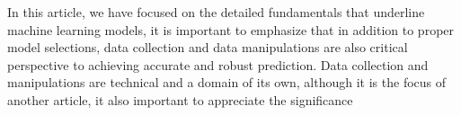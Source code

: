 
\par
In this article, we have focused on the detailed fundamentals that underline machine learning models, it is important to emphasize that in addition to proper model selections, data collection and data manipulations are also critical perspective to achieving accurate and robust prediction. Data collection and manipulations are technical and a domain of its own, although it is the focus of another article, it also important to appreciate the significance 
\par 
